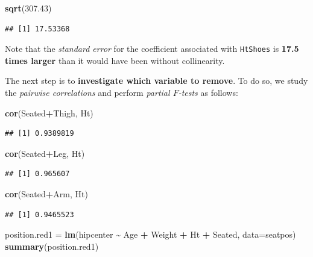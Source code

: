 \documentclass[
]{book}
\newenvironment{Shaded}{\begin{snugshade}}{\end{snugshade}}
\newcommand{\AttributeTok}[1]{\textcolor[rgb]{0.13,0.29,0.53}{#1}}
\newcommand{\FloatTok}[1]{\textcolor[rgb]{0.00,0.00,0.81}{#1}}
\newcommand{\FunctionTok}[1]{\textcolor[rgb]{0.13,0.29,0.53}{\textbf{#1}}}
\newcommand{\NormalTok}[1]{#1}
\newcommand{\OtherTok}[1]{\textcolor[rgb]{0.56,0.35,0.01}{#1}}
\newcommand{\SpecialCharTok}[1]{\textcolor[rgb]{0.81,0.36,0.00}{\textbf{#1}}}
\begin{document}
\begin{Shaded}
\begin{Highlighting}[]
\FunctionTok{sqrt}\NormalTok{(}\FloatTok{307.43}\NormalTok{)}
\end{Highlighting}
\end{Shaded}

\begin{verbatim}
## [1] 17.53368
\end{verbatim}

Note that the \emph{standard error} for the coefficient associated with \texttt{HtShoes} is \textbf{17.5 times larger} than it would have been without collinearity.

The next step is to \textbf{investigate which variable to remove}. To do so, we study the \emph{pairwise correlations} and perform \emph{partial \(F\)-tests} as follows:

\begin{Shaded}
\begin{Highlighting}[]
\FunctionTok{cor}\NormalTok{(Seated}\SpecialCharTok{+}\NormalTok{Thigh, Ht)}
\end{Highlighting}
\end{Shaded}

\begin{verbatim}
## [1] 0.9389819
\end{verbatim}

\begin{Shaded}
\begin{Highlighting}[]
\FunctionTok{cor}\NormalTok{(Seated}\SpecialCharTok{+}\NormalTok{Leg, Ht)}
\end{Highlighting}
\end{Shaded}

\begin{verbatim}
## [1] 0.965607
\end{verbatim}

\begin{Shaded}
\begin{Highlighting}[]
\FunctionTok{cor}\NormalTok{(Seated}\SpecialCharTok{+}\NormalTok{Arm, Ht)}
\end{Highlighting}
\end{Shaded}

\begin{verbatim}
## [1] 0.9465523
\end{verbatim}

\begin{Shaded}
\begin{Highlighting}[]
\NormalTok{position.red1 }\OtherTok{=} \FunctionTok{lm}\NormalTok{(hipcenter }\SpecialCharTok{\textasciitilde{}}\NormalTok{ Age }\SpecialCharTok{+}\NormalTok{ Weight }\SpecialCharTok{+}\NormalTok{ Ht }\SpecialCharTok{+}\NormalTok{ Seated, }\AttributeTok{data=}\NormalTok{seatpos)}
\FunctionTok{summary}\NormalTok{(position.red1)}
\end{Highlighting}
\end{Shaded}
\end{document}
